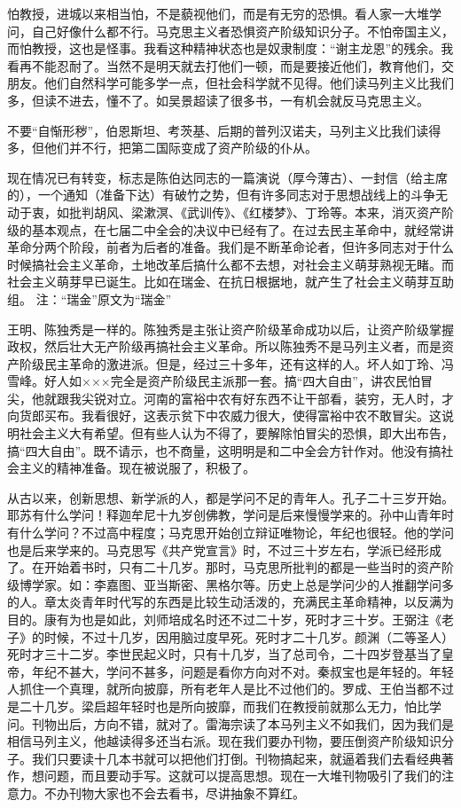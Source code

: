 怕教授，进城以来相当怕，不是藐视他们，而是有无穷的恐惧。看人家一大堆学问，自己好像什么都不行。马克思主义者恐惧资产阶级知识分子。不怕帝国主义，而怕教授，这也是怪事。我看这种精神状态也是奴隶制度：“谢主龙恩”的残余。我看再不能忍耐了。当然不是明天就去打他们一顿，而是要接近他们，教育他们，交朋友。他们自然科学可能多学一点，但社会科学就不见得。他们读马列主义比我们多，但读不进去，懂不了。如吴景超读了很多书，一有机会就反马克思主义。

不要“自惭形秽”，伯恩斯坦、考茨基、后期的普列汉诺夫，马列主义比我们读得多，但他们并不行，把第二国际变成了资产阶级的仆从。

现在情况已有转变，标志是陈伯达同志的一篇演说（厚今薄古）、一封信（给主席的），一个通知（准备下达）有破竹之势，但有许多同志对于思想战线上的斗争无动于衷，如批判胡风、梁漱溟、《武训传》、《红楼梦》、丁玲等。本来，消灭资产阶级的基本观点，在七届二中全会的决议中已经有了。在过去民主革命中，就经常讲革命分两个阶段，前者为后者的准备。我们是不断革命论者，但许多同志对于什么时候搞社会主义革命，土地改革后搞什么都不去想，对社会主义萌芽熟视无睹。而社会主义萌芽早已诞生。比如在瑞金、在抗日根据地，就产生了社会主义萌芽互助组。 注：“瑞金”原文为“瑞金”

王明、陈独秀是一样的。陈独秀是主张让资产阶级革命成功以后，让资产阶级掌握政权，然后壮大无产阶级再搞社会主义革命。所以陈独秀不是马列主义者，而是资产阶级民主革命的激进派。但是，经过三十多年，还有这样的人。坏人如丁玲、冯雪峰。好人如×××完全是资产阶级民主派那一套。搞“四大自由”，讲农民怕冒尖，他就跟我尖锐对立。河南的富裕中农有好东西不让干部看，装穷，无人时，才向货郎买布。我看很好，这表示贫下中农威力很大，使得富裕中农不敢冒尖。这说明社会主义大有希望。但有些人认为不得了，要解除怕冒尖的恐惧，即大出布告，搞“四大自由”。既不请示，也不商量，这明明是和二中全会方针作对。他没有搞社会主义的精神准备。现在被说服了，积极了。

从古以来，创新思想、新学派的人，都是学问不足的青年人。孔子二十三岁开始。耶苏有什么学问！释迦牟尼十九岁创佛教，学问是后来慢慢学来的。孙中山青年时有什么学问？不过高中程度；马克思开始创立辩证唯物论，年纪也很轻。他的学问也是后来学来的。马克思写《共产党宣言》时，不过三十岁左右，学派已经形成了。在开始着书时，只有二十几岁。那时，马克思所批判的都是一些当时的资产阶级博学家。如：李嘉图、亚当斯密、黑格尔等。历史上总是学问少的人推翻学问多的人。章太炎青年时代写的东西是比较生动活泼的，充满民主革命精神，以反满为目的。康有为也是如此，刘师培成名时还不过二十岁，死时才三十岁。王弼注《老子》的时候，不过十几岁，因用脑过度早死。死时才二十几岁。颜渊（二等圣人）死时才三十二岁。李世民起义时，只有十几岁，当了总司令，二十四岁登基当了皇帝，年纪不甚大，学问不甚多，问题是看你方向对不对。秦叔宝也是年轻的。年轻人抓住一个真理，就所向披靡，所有老年人是比不过他们的。罗成、王伯当都不过是二十几岁。梁启超年轻时也是所向披靡，而我们在教授前就那么无力，怕比学问。刊物出后，方向不错，就对了。雷海宗读了本马列主义不如我们，因为我们是相信马列主义，他越读得多还当右派。现在我们要办刊物，要压倒资产阶级知识分子。我们只要读十几本书就可以把他们打倒。刊物搞起来，就逼着我们去看经典著作，想问题，而且要动手写。这就可以提高思想。现在一大堆刊物吸引了我们的注意力。不办刊物大家也不会去看书，尽讲抽象不算红。

